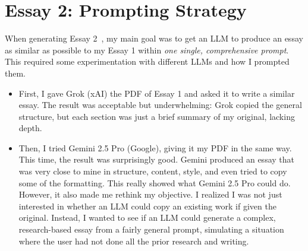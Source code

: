\documentclass[11pt,a4paper]{article}
\begin{document}
\section{Essay 2: Prompting Strategy}

When generating Essay 2~\cite{essay2}, my main goal was to get an LLM to produce an essay as similar as possible to my Essay 1 within \textit{one single, comprehensive prompt}. This required some experimentation with different LLMs and how I prompted them.

\begin{itemize}
    \item First, I gave Grok (xAI) the PDF of Essay 1 and asked it to write a similar essay. The result was acceptable but underwhelming: Grok copied the general structure, but each section was just a brief summary of my original, lacking depth.

    \item Then, I tried Gemini 2.5 Pro (Google), giving it my PDF in the same way. This time, the result was surprisingly good. Gemini produced an essay that was very close to mine in structure, content, style, and even tried to copy some of the formatting. This really showed what Gemini 2.5 Pro could do. However, it also made me rethink my objective. I realized I was not just interested in whether an LLM could copy an existing work if given the original. Instead, I wanted to see if an LLM could generate a complex, research-based essay from a fairly general prompt, simulating a situation where the user had not done all the prior research and writing.


\end{itemize}
\end{document}
